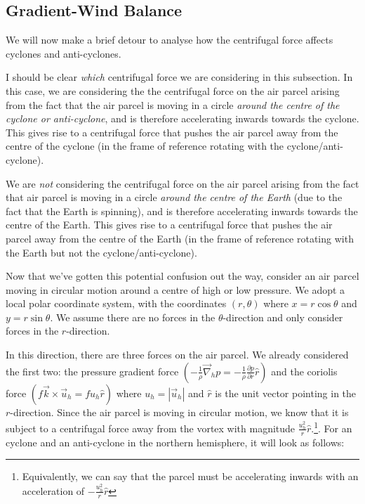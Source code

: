 \subsection{Gradient-Wind Balance}

We will now make a brief detour to analyse how the centrifugal force affects cyclones and anti-cyclones. 

I should be clear \textit{which} centrifugal force we are considering in this subsection. In this case, we are considering the the centrifugal force on the air parcel arising from the fact that the air parcel is moving in a circle \textit{around the centre of the cyclone or anti-cyclone}, and is therefore accelerating inwards towards the cyclone. This gives rise to a centrifugal force that pushes the air parcel away from the centre of the cyclone (in the frame of reference rotating with the cyclone/anti-cyclone).

We are \textit{not} considering the centrifugal force on the air parcel arising from the fact that air parcel is moving in a circle \textit{around the centre of the Earth} (due to the fact that the Earth is spinning), and is therefore accelerating inwards towards the centre of the Earth. This gives rise to a centrifugal force that pushes the air parcel away from the centre of the Earth (in the frame of reference rotating with the Earth but not the cyclone/anti-cyclone). 

Now that we've gotten this potential confusion out the way, consider an air parcel moving in circular motion around a centre of high or low pressure. We adopt a local polar coordinate system, with the coordinates $(r,\theta)$ where $x=r\cos\theta$ and $y=r\sin\theta$. We assume there are no forces in the $\theta$-direction and only consider forces in the $r$-direction.

In this direction, there are three forces on the air parcel. We already considered the first two: the pressure gradient force $\left( -\frac{1}{\rho}\vec{\nabla}_h p = -\frac{1}{\rho}\frac{\partial p}{\partial r} \hat{r} \right)$ and the coriolis force $\left( f\vec{k}\times \vec{u}_h = fu_h\hat{r}  \right)$ where $u_h=|\vec{u}_h|$ and $\hat{r}$ is the unit vector pointing in the $r$-direction. Since the air parcel is moving in circular motion, we know that it is subject to a centrifugal force away from the vortex with magnitude $\frac{u_h^2}{r}\hat{r}$.\footnote{Equivalently, we can say that the parcel must be accelerating inwards with an acceleration of $-\frac{u_h^2}{r}\hat{r}$}. For an cyclone and an anti-cyclone in the northern hemisphere, it will look as follows:

